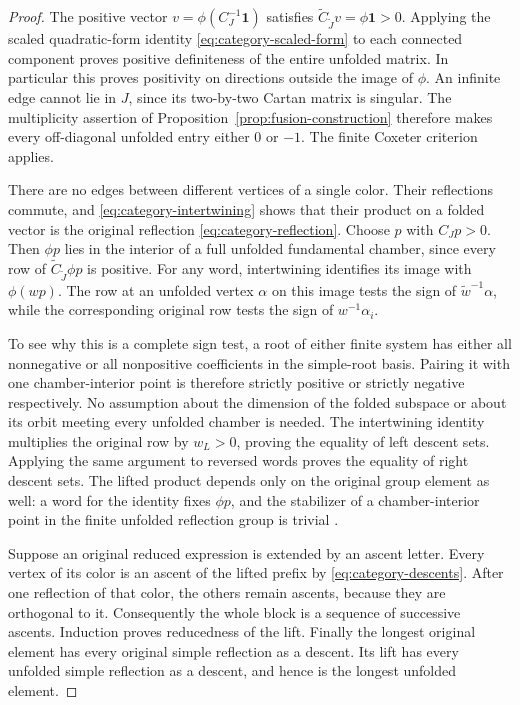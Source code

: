 \begin{proof}
The positive vector
$v=\phi(C_J^{-1}\mathbf1)$ satisfies
$\widetilde C_{\widetilde J}v=\phi\mathbf1>0$.
Applying the scaled quadratic-form identity
\eqref{eq:category-scaled-form} to each connected component proves
positive definiteness of the entire unfolded matrix. In particular
this proves positivity on directions outside the image of $\phi$.
An infinite edge cannot lie in $J$, since its two-by-two Cartan matrix
is singular. The multiplicity assertion of
Proposition~\ref{prop:fusion-construction} therefore makes every
off-diagonal unfolded entry either $0$ or $-1$. The finite Coxeter
criterion applies.

There are no edges between different vertices of a single color.
Their reflections commute, and
\eqref{eq:category-intertwining} shows that their product on a folded
vector is the original reflection
\eqref{eq:category-reflection}. Choose $p$ with $C_Jp>0$. Then
$\phi p$ lies in the interior of a full unfolded fundamental chamber,
since every row of $\widetilde C_{\widetilde J}\phi p$ is positive.
For any word, intertwining identifies its image with $\phi(wp)$.
The row at an unfolded vertex $\alpha$ on this image tests the sign
of $\widetilde w^{-1}\alpha$, while the corresponding original row
tests the sign of $w^{-1}\alpha_i$.

To see why this is a complete sign test, a root of either finite
system has either all nonnegative or all nonpositive coefficients in
the simple-root basis. Pairing it with one chamber-interior point is
therefore strictly positive or strictly negative respectively. No
assumption about the dimension of the folded subspace or about its
orbit meeting every unfolded chamber is needed. The intertwining
identity multiplies the original row by $w_L>0$, proving the equality
of left descent sets. Applying the same argument to reversed words
proves the equality of right descent sets. The lifted product depends
only on the original group element as well: a word for the identity
fixes $\phi p$, and the stabilizer of a chamber-interior point in the
finite unfolded reflection group is trivial
\cite[Chapter~V, \S3, no.~3]{Bourbaki2002}.

Suppose an original reduced expression is extended by an ascent
letter. Every vertex of its color is an ascent of the lifted prefix
by \eqref{eq:category-descents}. After one reflection of that color,
the others remain ascents, because they are orthogonal to it.
Consequently the whole block is a sequence of successive ascents.
Induction proves reducedness of the lift. Finally the longest
original element has every original simple reflection as a descent.
Its lift has every unfolded simple reflection as a descent, and hence
is the longest unfolded element.
\end{proof}

